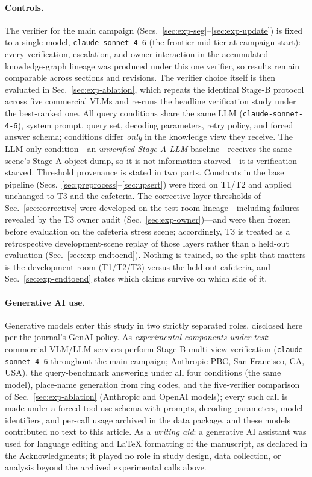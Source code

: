 \paragraph{Controls.}
The verifier for the main campaign (Secs.~\ref{sec:exp-seg}--\ref{sec:exp-update}) is fixed to a single
model, \texttt{claude-\hspace{0pt}sonnet-\hspace{0pt}4-6} (the frontier
mid-tier at campaign start):
every verification, escalation, and owner interaction in the accumulated
knowledge-graph lineage was produced under this one verifier, so results
remain comparable across sections and revisions. The verifier choice itself
is then evaluated in Sec.~\ref{sec:exp-ablation}, which repeats the
identical Stage-B protocol across five commercial VLMs and re-runs the
headline verification study under the best-ranked one.
All query conditions share the same LLM (\texttt{claude-sonnet-4-6}), system
prompt, query set, decoding parameters, retry policy, and forced answer
schema; conditions differ \emph{only} in the knowledge view they receive.
The LLM-only condition---an \emph{unverified Stage-A LLM} baseline---receives the same scene's Stage-A object dump, so it
is not information-starved---it is verification-starved.
Threshold provenance is stated in two parts. Constants in the base
pipeline (Secs.~\ref{sec:preprocess}--\ref{sec:upsert}) were fixed on
T1/T2 and applied unchanged to T3 and the cafeteria. The corrective-layer
thresholds of Sec.~\ref{sec:corrective} were developed on the test-room
lineage---including failures revealed by the T3 owner audit
(Sec.~\ref{sec:exp-owner})---and were then frozen before evaluation on
the cafeteria stress scene; accordingly, T3 is treated as a retrospective
development-scene replay of those layers rather than a held-out
evaluation (Sec.~\ref{sec:exp-endtoend}). Nothing is trained, so the
split that matters is the development room (T1/T2/T3) versus the
held-out cafeteria, and Sec.~\ref{sec:exp-endtoend} states which claims
survive on which side of it.

\paragraph{Generative AI use.}
Generative models enter this study in two strictly separated roles,
disclosed here per the journal's GenAI policy. As \emph{experimental
components under test}: commercial VLM/LLM services perform Stage-B
multi-view verification (\texttt{claude-sonnet-4-6} throughout the main
campaign; Anthropic PBC, San Francisco, CA, USA), the query-benchmark
answering under all four conditions (the same model), place-name
generation from ring codes, and the five-verifier comparison of
Sec.~\ref{sec:exp-ablation} (Anthropic and OpenAI models); every such
call is made under a forced tool-use schema with prompts, decoding
parameters, model identifiers, and per-call usage archived in the data
package, and these models contributed no text to this article. As a
\emph{writing aid}: a generative AI assistant was used for language
editing and LaTeX formatting of the manuscript, as declared in the
Acknowledgments; it played no role in study design, data collection, or
analysis beyond the archived experimental calls above.

